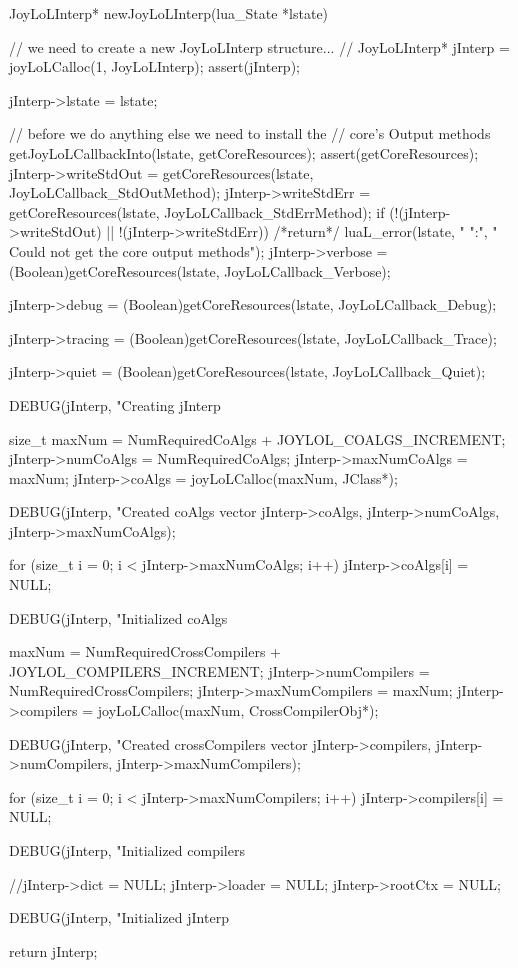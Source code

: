 \startCCode
JoyLoLInterp* newJoyLoLInterp(lua_State *lstate) {
  // we need to create a new JoyLoLInterp structure...
  //
  JoyLoLInterp* jInterp = joyLoLCalloc(1, JoyLoLInterp);
  assert(jInterp);

  jInterp->lstate = lstate;
  
  // before we do anything else we need to install the
  // core's Output methods
  getJoyLoLCallbackInto(lstate, getCoreResources);
  assert(getCoreResources);
  jInterp->writeStdOut =
    getCoreResources(lstate, JoyLoLCallback_StdOutMethod);
  jInterp->writeStdErr =
    getCoreResources(lstate, JoyLoLCallback_StdErrMethod);
  if (!(jInterp->writeStdOut) || !(jInterp->writeStdErr)) {
    /*return*/ luaL_error(lstate, "%
      "\nERROR:\n",
      "  Could not get the core output methods\n");
  }
  jInterp->verbose =
    (Boolean)getCoreResources(lstate, JoyLoLCallback_Verbose);
    
  jInterp->debug = 
    (Boolean)getCoreResources(lstate, JoyLoLCallback_Debug);
    
  jInterp->tracing = 
    (Boolean)getCoreResources(lstate, JoyLoLCallback_Trace);

  jInterp->quiet =
    (Boolean)getCoreResources(lstate, JoyLoLCallback_Quiet);

  DEBUG(jInterp, "Creating jInterp %
    
  size_t maxNum =
    NumRequiredCoAlgs + JOYLOL_COALGS_INCREMENT;
  jInterp->numCoAlgs    = NumRequiredCoAlgs;
  jInterp->maxNumCoAlgs = maxNum;
  jInterp->coAlgs       = joyLoLCalloc(maxNum, JClass*);
  
  DEBUG(jInterp, "Created coAlgs vector %
    jInterp->coAlgs, jInterp->numCoAlgs, jInterp->maxNumCoAlgs);
  
  for (size_t i = 0; i < jInterp->maxNumCoAlgs; i++) {
    jInterp->coAlgs[i] = NULL;
  }

  DEBUG(jInterp, "Initialized coAlgs %
  
  maxNum =
    NumRequiredCrossCompilers + JOYLOL_COMPILERS_INCREMENT;
  jInterp->numCompilers    = NumRequiredCrossCompilers;
  jInterp->maxNumCompilers = maxNum;
  jInterp->compilers       = joyLoLCalloc(maxNum, CrossCompilerObj*);

  DEBUG(jInterp, "Created crossCompilers vector %
    jInterp->compilers, 
    jInterp->numCompilers,
    jInterp->maxNumCompilers);

  for (size_t i = 0; i < jInterp->maxNumCompilers; i++) {
    jInterp->compilers[i] = NULL;
  }

  DEBUG(jInterp, "Initialized compilers %

  //jInterp->dict    = NULL;
  jInterp->loader  = NULL;
  jInterp->rootCtx = NULL;
    
  DEBUG(jInterp, "Initialized jInterp %

  return jInterp;
}
\stopCCode

